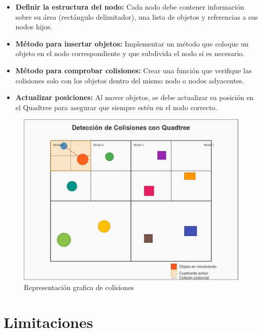 \documentclass[9pt,a4paper,twoside]{rho-class/rho}
\begin{document}
        \begin{itemize}
            \item \textbf{Definir la estructura del nodo:} Cada nodo debe contener información sobre su área (rectángulo delimitador), una lista de objetos y referencias a sus nodos hijos.
            
            \item \textbf{Método para insertar objetos:} Implementar un método que coloque un objeto en el nodo correspondiente y que subdivida el nodo si es necesario.
            
            \item \textbf{Método para comprobar colisiones:} Crear una función que verifique las colisiones solo con los objetos dentro del mismo nodo o nodos adyacentes.
            
            \item \textbf{Actualizar posiciones:} Al mover objetos, se debe actualizar su posición en el Quadtree para asegurar que siempre estén en el nodo correcto.
        \end{itemize}
        \begin{figure}[h]
            \centering
            \includegraphics[width=\linewidth]{figures/quadtree-collision.pdf}
            \caption{Representación grafica de colisiones} 
            \label{fig:colision_figure}
        \end{figure}
    \section{Limitaciones}
        
\end{document}
